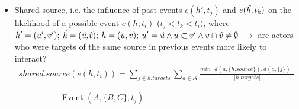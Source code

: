 \begin{itemize}
\begin{itemize}
			\item Shared source, i.e. the influence of past events $e(h',t_j)$ and $e(\text{\emph{\^h}},t_k)$ on the likelihood of a possible event $e(h,t_i)$ ($t_j < t_k < t_i)$, where $h' = (u',v'); \: \text{\emph{\^h}} = (\text{\emph{\^u,\^v}}); \: h = (u,v); \: u' = \text{\emph{\^u}} \land u \subset v' \land v \cap \text{\emph{\^v}} \neq \emptyset$ $\rightarrow$ are actors who were targets of the same source in previous events more likely to interact?
			\begin{align*}
				shared.source(e(h,t_i)) = \sum_{j \in h.targets} \sum_{a \in \mathcal{A}} \frac{min[d(a,\{h.source\}),d(a,\{j\})]}{\lvert h.targets \rvert}
			\end{align*}
			\begin{figure}
				\begin{mdframed}
					\centering
					\begin{subfigure}[t]{0.3\linewidth}
						\vskip 0pt
						\caption{Event $(A,\{B,C\},t_j)$}
					\end{subfigure}
					\hfill
					\begin{subfigure}[t]{0.3\linewidth}
						\vskip 0pt
\end{subfigure}
\end{mdframed}
\end{figure}
\end{itemize}
\end{itemize}
